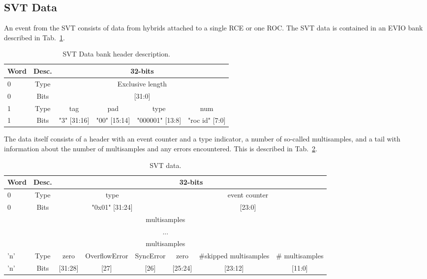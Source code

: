 \documentclass{desyproc}
\begin{document}
\subsection{SVT Data}
\label{sec:svt-data}
An event from the SVT consists of data from hybrids attached to a single RCE or one ROC. The 
SVT data is contained in an EVIO bank described in Tab.~\ref{tab:svt-data-bank-header}. \begin{table}[]
  \begin{center}
    \caption{SVT Data bank header description.}
    \label{tab:svt-data-bank-header}
    \begin{tabular}{|l|c|c|c|c|c|}
   	\hline
    	\bf Word & \bf Desc. & \multicolumn{4}{|c|}{\bf 32-bits}\\
      	\hline
    	 0 &  Type & \multicolumn{4}{|c|}{Exclusive length}\\
	\hline
    	 0 &  Bits & \multicolumn{4}{|c|}{[31:0]}\\
	\hline
    	 1 &  Type & tag & pad & type & num\\
	\hline
    	 1 &  Bits & "3" [31:16] & "00" [15:14] & "000001" [13:8] &  "roc id" [7:0]\\
	\hline
      \end{tabular}
  \end{center}
\end{table}
The data itself consists of a header with an event counter and a type indicator, a number of so-called multisamples, and 
a tail with information about the number of multisamples and any errors encountered. This is 
described in Tab.~\ref{tab:svt-data}.
\begin{table}[]
  \begin{center}
    \caption{SVT data.}
    \label{tab:svt-data}
    \begin{tabular}{|l|c|c|c|c|c|c|c|}
   	\hline
    	\bf Word & \bf Desc. & \multicolumn{6}{|c|}{\bf 32-bits}\\
      	\hline
    	 0 &  Type & \multicolumn{3}{|c|}{type} & \multicolumn{3}{|c|}{event counter}\\
	\hline
    	 0 &  Bits & \multicolumn{3}{|c|}{"0x01" [31:24]} & \multicolumn{3}{|c|}{[23:0]}\\
      	\hline
	\multicolumn{8}{|c|}{multisamples}\\
	\multicolumn{8}{|c|}{...}\\
	\multicolumn{8}{|c|}{multisamples}\\
	\hline
	 'n' &  Type & zero & OverflowError & SyncError & zero & \#skipped multisamples & \# multisamples\\
      	\hline
    	 'n' &  Bits & [31:28] & [27] & [26] & [25:24] & [23:12] & [11:0]\\
	\hline
      \end{tabular}
  \end{center}
\end{table}
\end{document}
